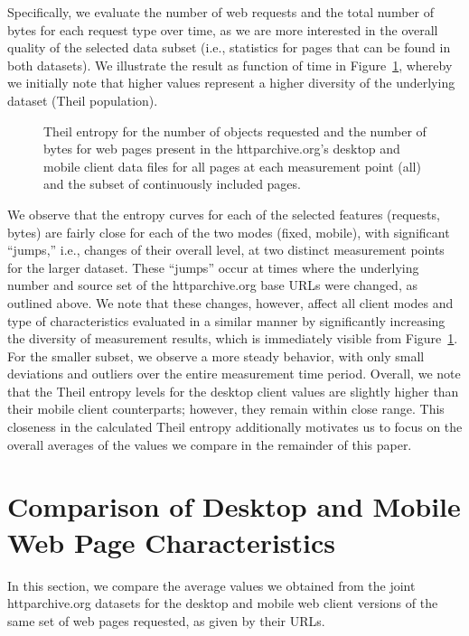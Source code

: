 Specifically, we evaluate the number of web requests and the total number of bytes for each request type over time, as we are more interested in the overall quality of the selected data subset (i.e., statistics for pages that can be found in both datasets).
We illustrate the result as function of time in Figure~\ref{fig:theil}, whereby we initially note that higher values represent a higher diversity of the underlying dataset (Theil population).
\begin{figure}[t]
	\centering
	\qquad
	\caption{Theil entropy for the number of objects requested and the number of bytes for web pages present in the httparchive.org's desktop and mobile client data files for all pages at each measurement point (all) and the subset of continuously included pages.}
	\label{fig:theil}
\end{figure}
We observe that the entropy curves for each of the selected features (requests, bytes) are fairly close for each of the two modes (fixed, mobile), with significant ``jumps,'' i.e., changes of their overall level, at two distinct measurement points for the larger dataset.
These ``jumps'' occur at times where the underlying number and source set of the httparchive.org base URLs were changed, as outlined above.
We note that these changes, however, affect all client modes and type of characteristics evaluated in a similar manner by significantly increasing the diversity of measurement results, which is immediately visible from Figure~\ref{fig:theil}.
For the smaller subset, we observe a more steady behavior, with only small deviations and outliers over the entire measurement time period.
Overall, we note that the Theil entropy levels for the desktop client values are slightly higher than their mobile client counterparts; however, they remain within close range.
This closeness in the calculated Theil entropy additionally motivates us to focus on the overall averages of the values we compare in the remainder of this paper.


\section*{Comparison of Desktop and Mobile Web Page Characteristics}
\label{s:compare}
In this section, we compare the average values we obtained from the joint httparchive.org datasets for the desktop and mobile web client versions of the same set of web pages requested, as given by their URLs.

